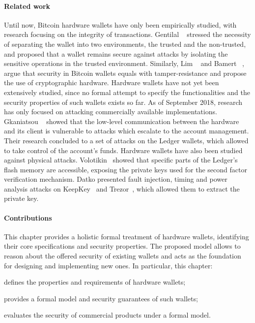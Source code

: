\paragraph{Related work}
Until now, Bitcoin hardware wallets have only been empirically studied, with
research focusing on the integrity of transactions. Gentilal
\etal~\cite{gentilal2017trustzone} stressed the necessity of separating the
wallet into two environments, the trusted and the non-trusted, and proposed
that a wallet remains secure against attacks by isolating the sensitive
operations in the trusted environment. Similarly, Lim
\etal~\cite{lim2014analysis} and Bamert \etal~\cite{bamert2014bluewallet},
argue that security in Bitcoin wallets equals with tamper-resistance and
propose the use of cryptographic hardware. Hardware wallets have not yet been
extensively studied, since no formal attempt to specify the functionalities and
the security properties of such wallets exists so far. As of September 2018,
research  has only focused on attacking commercially available implementations.
Gkaniatsou \etal~\cite{ISC:GkaAraKia17} showed that the low-level communication
between the hardware and its client is vulnerable to attacks which escalate to
the account management.  Their research concluded to a set of attacks on the
Ledger wallets, which allowed to take control of the account's funds.  Hardware
wallets have also been studied against physical attacks.
Volotikin~\cite{volotikin2018bh} showed that specific parts of the Ledger's
flash memory are accessible, exposing the private keys used for the second
factor verification mechanism.  Datko \etal presented fault injection, timing
and power analysis attacks on KeepKey~\cite{keepkey} and Trezor~\cite{trezor},
which allowed them to extract the private key.

\paragraph{Contributions}
This chapter provides a holistic formal treatment of hardware wallets,
identifying their core specifications and security properties.  The proposed
model allows to reason about the offered security of existing wallets and acts
as the foundation for designing and implementing new ones. In particular, this
chapter:
\begin{inparaenum}[i)]
 \item defines the properties and requirements of hardware wallets;
 \item provides a formal model and security guarantees of such wallets;
 \item evaluates the security of commercial products under a formal model.
\end{inparaenum}

